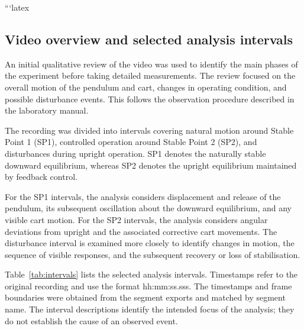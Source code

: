 \documentclass[11pt,a4paper]{article}
\newcommand{\manual}[1]{\cite[printed pp.~#1]{labmanual}}
\begin{document}
```latex
\subsection{Video overview and selected analysis intervals}
\label{sec:video-overview}

An initial qualitative review of the video was used to identify
the main phases of the experiment before taking detailed
measurements. The review focused on the overall motion of the
pendulum and cart, changes in operating condition, and possible
disturbance events. This follows the observation procedure
described in the laboratory manual. \manual{3--4}

The recording was divided into intervals covering natural motion
around Stable Point 1 (SP1), controlled operation around Stable
Point 2 (SP2), and disturbances during upright operation.
SP1 denotes the naturally stable downward equilibrium, whereas
SP2 denotes the upright equilibrium maintained by feedback
control. \manual{2, 6--8}

For the SP1 intervals, the analysis considers displacement and
release of the pendulum, its subsequent oscillation about the
downward equilibrium, and any visible cart motion.
For the SP2 intervals, the analysis considers angular deviations
from upright and the associated corrective cart movements.
The disturbance interval is examined more closely to identify
changes in motion, the sequence of visible responses, and the
subsequent recovery or loss of stabilisation.
\manual{10--11, 14--20}

Table~\ref{tab:intervals} lists the selected analysis intervals.
Timestamps refer to the original recording and use the format
hh:mm:ss.sss. The timestamps and frame boundaries were obtained
from the segment exports and matched by segment name.
The interval descriptions identify the intended focus of the
analysis; they do not establish the cause of an observed event.
\end{document}
